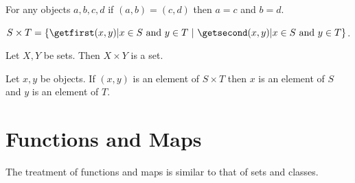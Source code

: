 \documentclass{article}
\begin{document}
\begin{forthel}
  \begin{axiom}
    For any objects $a, b, c, d$ if $(a,b) = (c,d)$ then $a = c$ and $b = d$.
  \end{axiom}

  \begin{definition}
    $S \times T = \class{(x,y) | \text{$x \in S$ and $y \in T$}}$.
  \end{definition}

  \begin{axiom}
    Let $X, Y$ be sets.
    Then $X \times Y$ is a set.
  \end{axiom}

  \begin{lemma}
    Let $x, y$ be objects.
    If $(x,y)$ is an element of $S \times T$ then $x$ is an element of $S$ and
    $y$ is an element of $T$.
  \end{lemma}
\end{forthel}


\section{Functions and Maps}

The treatment of functions and maps is similar to that
of sets and classes.
\end{document}
